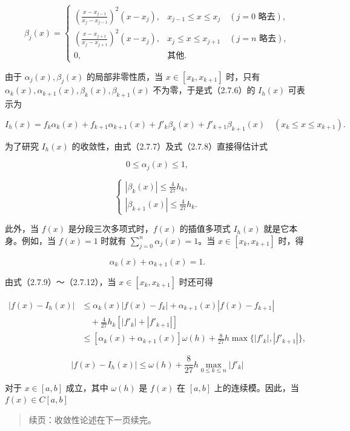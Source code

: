 \[\beta_j(x)=\begin{cases}
\displaystyle\left(\frac{x-x_{j-1}}{x_j-x_{j-1}}\right)^2(x-x_j),&x_{j-1}\leqslant x\leqslant x_j\quad(j=0\text{ 略去}),\\[6pt]
\displaystyle\left(\frac{x-x_{j+1}}{x_j-x_{j+1}}\right)^2(x-x_j),&x_j\leqslant x\leqslant x_{j+1}\quad(j=n\text{ 略去}),\\[6pt]
0,&\text{其他}.
\end{cases}\tag{2.7.8}\]

由于 \(\alpha_j(x),\beta_j(x)\) 的局部非零性质，当 \(x\in[x_k,x_{k+1}]\) 时，只有 \(\alpha_k(x),\alpha_{k+1}(x),\beta_k(x),\beta_{k+1}(x)\) 不为零，于是式（2.7.6）的 \(I_h(x)\) 可表示为

\[I_h(x)=f_k\alpha_k(x)+f_{k+1}\alpha_{k+1}(x)+f'_k\beta_k(x)+f'_{k+1}\beta_{k+1}(x)\quad(x_k\leqslant x\leqslant x_{k+1}).\tag{2.7.9}\]

为了研究 \(I_h(x)\) 的收敛性，由式（2.7.7）及式（2.7.8）直接得估计式

\[0\leqslant\alpha_j(x)\leqslant1,\tag{2.7.10}\]

\[\begin{cases}
\displaystyle|\beta_k(x)|\leqslant\frac{4}{27}h_k,\\[6pt]
\displaystyle|\beta_{k+1}(x)|\leqslant\frac{4}{27}h_k.
\end{cases}\tag{2.7.11}\]

此外，当 \(f(x)\) 是分段三次多项式时，\(f(x)\) 的插值多项式 \(I_h(x)\) 就是它本身。例如，当 \(f(x)=1\) 时就有 \(\sum_{j=0}^n\alpha_j(x)=1\)。当 \(x\in[x_k,x_{k+1}]\) 时，得

\[\alpha_k(x)+\alpha_{k+1}(x)=1.\tag{2.7.12}\]

由式（2.7.9）～（2.7.12），当 \(x\in[x_k,x_{k+1}]\) 时还可得

\[\begin{aligned}
|f(x)-I_h(x)|&\leqslant\alpha_k(x)|f(x)-f_k|+\alpha_{k+1}(x)|f(x)-f_{k+1}|\\
&\quad+\frac{4}{27}h_k[|f'_k|+|f'_{k+1}|]\\
&\leqslant[\alpha_k(x)+\alpha_{k+1}(x)]\omega(h)+\frac{8}{27}h\max\{|f'_k|,|f'_{k+1}|\},
\end{aligned}\]

\[|f(x)-I_h(x)|\leqslant\omega(h)+\frac{8}{27}h\max_{0\leqslant k\leqslant n}|f'_k|\tag{2.7.13}\]

对于 \(x\in[a,b]\) 成立，其中 \(\omega(h)\) 是 \(f(x)\) 在 \([a,b]\) 上的连续模。因此，当 \(f(x)\in C[a,b]\)

\begin{quote}
续页：收敛性论述在下一页续完。
\end{quote}

